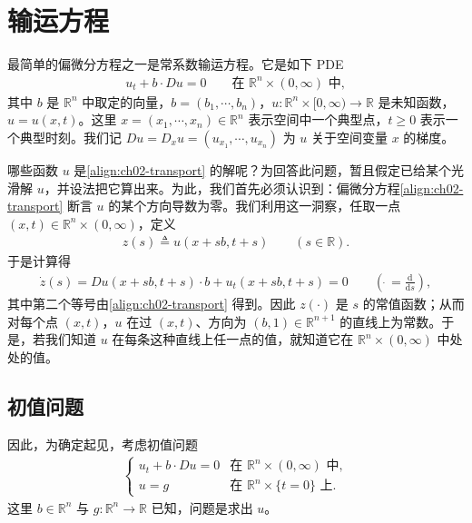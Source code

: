 \documentclass[../../main.tex]{subfiles}
\begin{document}
\section{输运方程}\label{section:ch02-transport}

最简单的偏微分方程之一是常系数输运方程。它是如下 PDE
\begin{align}\label{align:ch02-transport}
u_t+b\cdot Du=0 \qquad \text{在 }\mathbb{R}^n\times(0,\infty)\text{ 中},
\end{align}
其中 $b$ 是 $\mathbb{R}^n$ 中取定的向量，$b=(b_1,\cdots,b_n)$，$u:\mathbb{R}^n\times[0,\infty)\to\mathbb{R}$ 是未知函数，$u=u(x,t)$。这里 $x=(x_1,\cdots,x_n)\in\mathbb{R}^n$ 表示空间中一个典型点，$t\geqslant 0$ 表示一个典型时刻。我们记 $Du=D_xu=(u_{x_1},\cdots,u_{x_n})$ 为 $u$ 关于空间变量 $x$ 的梯度。

哪些函数 $u$ 是\eqref{align:ch02-transport} 的解呢？为回答此问题，暂且假定已给某个光滑解 $u$，并设法把它算出来。为此，我们首先必须认识到：偏微分方程\eqref{align:ch02-transport} 断言 $u$ 的某个方向导数为零。我们利用这一洞察，任取一点 $(x,t)\in\mathbb{R}^n\times(0,\infty)$，定义
\begin{align*}
z(s)\triangleq u(x+sb,t+s) \qquad (s\in\mathbb{R}).
\end{align*}
于是计算得
\begin{align*}
\dot{z}(s)=Du(x+sb,t+s)\cdot b+u_t(x+sb,t+s)=0 \qquad \left(\dot{\ }=\frac{\mathrm{d}}{\mathrm{d}s}\right),
\end{align*}
其中第二个等号由\eqref{align:ch02-transport} 得到。因此 $z(\cdot)$ 是 $s$ 的常值函数；从而对每个点 $(x,t)$，$u$ 在过 $(x,t)$、方向为 $(b,1)\in\mathbb{R}^{n+1}$ 的直线上为常数。于是，若我们知道 $u$ 在每条这种直线上任一点的值，就知道它在 $\mathbb{R}^n\times(0,\infty)$ 中处处的值。

\subsection{初值问题}\label{subsection:ch02-transport-ivp}

因此，为确定起见，考虑初值问题
\begin{align}\label{align:ch02-transport-ivp}
\begin{cases}
u_t+b\cdot Du=0 & \text{在 }\mathbb{R}^n\times(0,\infty)\text{ 中},\\
u=g & \text{在 }\mathbb{R}^n\times\{t=0\}\text{ 上}.
\end{cases}
\end{align}
这里 $b\in\mathbb{R}^n$ 与 $g:\mathbb{R}^n\to\mathbb{R}$ 已知，问题是求出 $u$。
\end{document}

